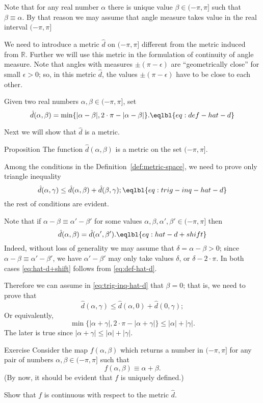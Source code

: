 Note that for any real number $\alpha$ there is unique value $\beta\in(-\pi,\pi]$ such that
$\beta\equiv \alpha$.
By that reason we may assume that angle measure takes value in the real interval $(-\pi,\pi]$

We need to introduce a metric $\hat{d}$ on $(-\pi,\pi]$
different from the metric induced from $\mathbb{R}$.
Further we will use this metric in the formulation 
of continuity of angle measure.
Note that angles with measures $\pm(\pi-\epsilon)$ are ``geometrically close'' for small $\epsilon>0$;
so, in this metric $\hat{d}$, the values $\pm(\pi-\epsilon)$ have to be close to each other.

Given two real numbers 
$\alpha,\beta\in (-\pi,\pi]$,
set \label{def:max-dist}
$$\hat{d}(\alpha,\beta)
=
\min\{|\alpha-\beta|,2\cdot\pi-|\alpha-\beta|\}.
\eqlbl{eq:def-hat-d}
$$

Next we will show that $\hat{d}$ is a metric.

\begin{thm}{Proposition}
The function $\hat{d}(\alpha,\beta)$ is a metric on the set $(-\pi,\pi]$.
\end{thm}

Among the conditions in the Definition~\ref{def:metric-space}, we need to prove only triangle inequality
$$\hat{d}(\alpha,\gamma)\le \hat{d}(\alpha,\beta)+\hat{d}(\beta,\gamma);
\eqlbl{eq:trig-inq-hat-d}$$
the rest of conditions are  evident.

Note that if $\alpha-\beta\equiv \alpha'-\beta'$
for some values 
$\alpha,\beta,\alpha',\beta'\in (-\pi,\pi]$
then 
$$\hat{d}(\alpha,\beta)
=
\hat{d}(\alpha',\beta').
\eqlbl{eq:hat-d+shift}$$
Indeed, without loss of generality we may assume that $\delta=\alpha-\beta>0$;
since $\alpha-\beta\equiv \alpha'-\beta'$,
we have $\alpha'-\beta'$ may only take  values $\delta$, or $\delta-2\cdot\pi $.
In both cases \ref{eq:hat-d+shift} follows from \ref{eq:def-hat-d}.

Therefore we can assume in \ref{eq:trig-inq-hat-d}
that $\beta=0$;
that is, we need to prove that
$$\hat{d}(\alpha,\gamma)
\le 
\hat{d}(\alpha,0)+\hat{d}(0,\gamma);
$$
Or equivalently,
$$\min\{|\alpha+\gamma|,2\cdot\pi-|\alpha+\gamma|\}\le |\alpha|+|\gamma|.$$
The later is true since 
$|\alpha+\gamma|\le |\alpha|+|\gamma|$.
\qeds

\begin{thm}{Exercise}\label{ex:hat-d-and-+}
Consider the map 
$f(\alpha,\beta)$ which returns a number in $(-\pi,\pi]$ for any pair of numbers $\alpha,\beta\in (-\pi,\pi]$
such that 
$$f(\alpha,\beta)\equiv \alpha+\beta.$$
(By now, it should be evident that $f$ is uniquely defined.)

Show that $f$ is continuous with respect to the metric $\hat d$.
\end{thm}











